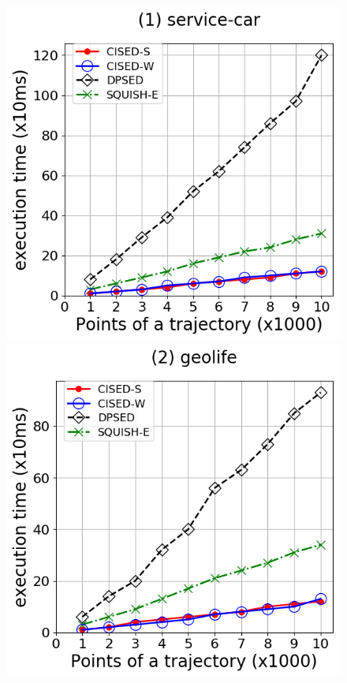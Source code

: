 {\begin{figure}[tb!]
\centering
\includegraphics[scale = 0.275]{Figures/Exp-time-size-service.png}\hspace{3ex}
\includegraphics[scale = 0.275]{Figures/Exp-time-size-geolife.png}\hspace{3ex}

\end{figure}}

